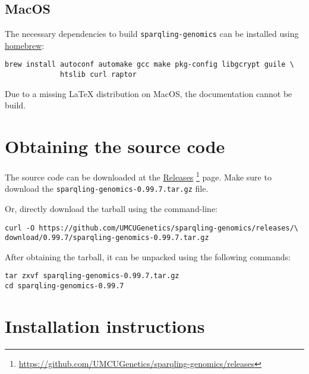 \subsection{MacOS}

  The necessary dependencies to build \texttt{sparqling-genomics} can be
  installed using \href{https://brew.sh/}{homebrew}:

\begin{siderules}
\begin{verbatim}
brew install autoconf automake gcc make pkg-config libgcrypt guile \
             htslib curl raptor
\end{verbatim}
\end{siderules}

  Due to a missing \LaTeX{} distribution on MacOS, the documentation
  cannot be build.

\section{Obtaining the source code}
\label{sec:obtaining-tarball}

  \begin{sloppypar}
  The source code can be downloaded at the
  \href{https://github.com/UMCUGenetics/sparqling-genomics/releases}%
  {Releases}%
  \footnote{\url{https://github.com/UMCUGenetics/sparqling-genomics/releases}}
  page.  Make sure to download the \mbox{\texttt{sparqling-genomics-0.99.7.tar.gz}}
  file.
  \end{sloppypar}

  Or, directly download the tarball using the command-line:
\begin{siderules}
\begin{verbatim}
curl -O https://github.com/UMCUGenetics/sparqling-genomics/releases/\
download/0.99.7/sparqling-genomics-0.99.7.tar.gz
\end{verbatim}
\end{siderules}

  After obtaining the tarball, it can be unpacked using the following commands:

\begin{siderules}
\begin{verbatim}
tar zxvf sparqling-genomics-0.99.7.tar.gz
cd sparqling-genomics-0.99.7
\end{verbatim}
\end{siderules}

\section{Installation instructions}

